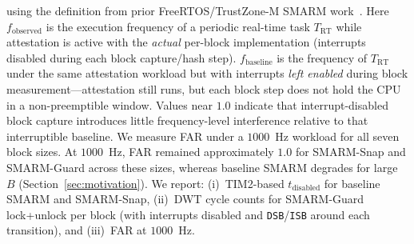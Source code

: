 \documentclass[conference]{IEEEtran}
\newcommand{\tdis}{$t_{\mathrm{disabled}}$\xspace}
\newcommand{\FAR}{FAR\xspace}
\newcommand{\smarmcopy}{SMARM-Snap\xspace}
\newcommand{\smarmlock}{SMARM-Guard\xspace}
\begin{document}
using the definition from prior FreeRTOS/TrustZone-M SMARM
work~\cite{smarmplus2026}.
Here $f_{\mathrm{observed}}$ is the execution frequency of a periodic
real-time task $T_{\mathrm{RT}}$ while attestation is active with the
\emph{actual} per-block implementation (interrupts disabled during each
block capture/hash step).
$f_{\mathrm{baseline}}$ is the frequency of $T_{\mathrm{RT}}$ under the
same attestation workload but with interrupts \emph{left enabled} during
block measurement---attestation still runs, but each block step does not
hold the CPU in a non-preemptible window.
Values near $1.0$ indicate that interrupt-disabled block capture
introduces little frequency-level interference relative to that
interruptible baseline.
We measure \FAR{} under a $1000$~Hz workload for all seven block sizes.
At $1000$~Hz, \FAR{} remained approximately $1.0$ for \smarmcopy{} and
\smarmlock{} across these sizes, whereas baseline SMARM degrades for
large~$B$ (Section~\ref{sec:motivation}).
We report: (i)~TIM2-based \tdis{} for baseline SMARM and \smarmcopy{},
(ii)~DWT cycle counts for \smarmlock{} lock+unlock per block (with
interrupts disabled and \texttt{DSB}/\texttt{ISB} around each transition),
and (iii)~\FAR{} at $1000$~Hz.
\end{document}
